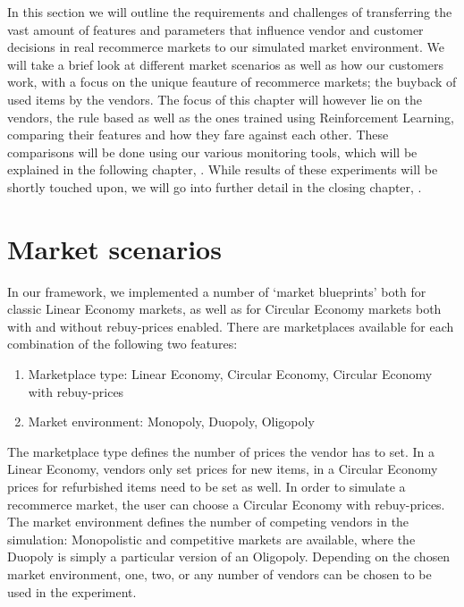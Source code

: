 \begin{jointwork}\label{ch:SimulatingMarketplace}
	In this section we will outline the requirements and challenges of transferring the vast amount of features and parameters that influence vendor and customer decisions in real recommerce markets to our simulated market environment. We will take a brief look at different market scenarios as well as how our customers work, with a focus on the unique feauture of recommerce markets; the buyback of used items by the vendors. The focus of this chapter will however lie on the vendors, the rule based as well as the ones trained using Reinforcement Learning, comparing their features and how they fare against each other. These comparisons will be done using our various monitoring tools, which will be explained in the following chapter, . While results of these experiments will be shortly touched upon, we will go into further detail in the closing chapter, .
\end{jointwork}

\section{Market scenarios}\label{sec:MarketScenarios}

In our framework, we implemented a number of `market blueprints' both for classic Linear Economy markets, as well as for Circular Economy markets both with and without rebuy-prices enabled. There are marketplaces available for each combination of the following two features:
\begin{enumerate}
	\item Marketplace type: Linear Economy, Circular Economy, Circular Economy with rebuy-prices
	\item Market environment: Monopoly, Duopoly, Oligopoly
\end{enumerate}
The marketplace type defines the number of prices the vendor has to set. In a Linear Economy, vendors only set prices for new items, in a Circular Economy prices for refurbished items need to be set as well. In order to simulate a recommerce market, the user can choose a Circular Economy with rebuy-prices.
The market environment defines the number of competing vendors in the simulation: Monopolistic and competitive markets are available, where the Duopoly is simply a particular version of an Oligopoly. Depending on the chosen market environment, one, two, or any number of vendors can be chosen to be used in the experiment.


